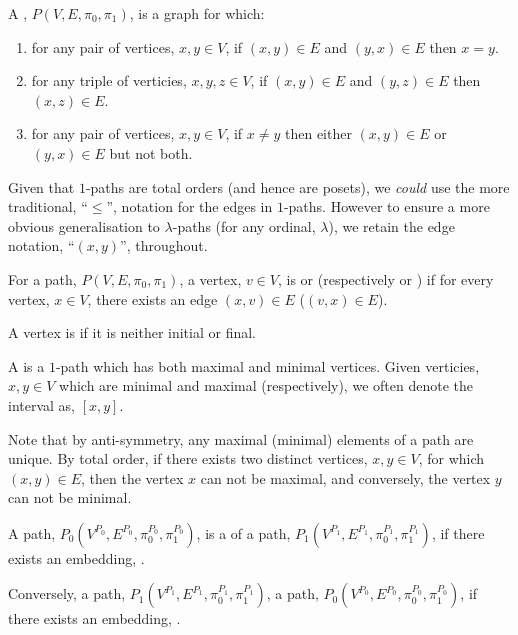 \documentclass[a4paper]{amsart}
\begin{document}
\begin{definition}
A , $P(V, E, \pi_0, \pi_1)$, is a graph for which:

\begin{enumerate}
\item {} for any pair of vertices, $x, y \in V$, if $(x,y) \in E$ and
$(y,x) \in E$ then $x = y$.

\item {} for any triple of verticies, $x, y, z \in V$, 
if $(x,y) \in E$ and $(y,z) \in E$ then $(x,z) \in E$.

\item {} for any pair of vertices, $x, y \in V$, if $x \neq y$ then
either $(x,y) \in E$ or $(y,x) \in E$ but not both.
\end{enumerate}
\end{definition}

Given that $1$-paths are total orders (and hence are posets), we \emph{could} use the more
traditional, ``$\leq$'', notation for the edges in $1$-paths. However to ensure a more
obvious generalisation to $\lambda$-paths (for any ordinal, $\lambda$), we retain the edge
notation, ``$(x,y)$'', throughout.

\begin{definition}
For a path, $P(V, E, \pi_0, \pi_1)$, a vertex, $v \in V$, is  or
 (respectively  or ) if for every
vertex, $x \in V$, there exists an edge $(x,v) \in E$ ($(v, x) \in E$).

A vertex is  if it is neither initial or final.

A  is a $1$-path which has both maximal and minimal vertices. Given 
verticies, $x, y \in V$ which are minimal and maximal (respectively), we often denote the 
interval as, $[x,y]$.
\end{definition}

Note that by anti-symmetry, any maximal (minimal) elements of a path are unique. By total
order, if there exists two distinct vertices, $x,y \in V$, for which $(x,y) \in E$, then
the vertex $x$ can not be maximal, and conversely, the vertex $y$ can not be minimal.

\begin{definition}
A path, $P_0(V^{P_0}, E^{P_0}, \pi^{P_0}_0, \pi^{P_0}_1)$, is a  of a
path, $P_1(V^{P_1}, E^{P_1}, \pi^{P_1}_0, \pi^{P_1}_1)$, if there exists an embedding,
.

Conversely, a path, $P_1(V^{P_1}, E^{P_1}, \pi^{P_1}_0, \pi^{P_1}_1)$, 
a path, $P_0(V^{P_0}, E^{P_0}, \pi^{P_0}_0, \pi^{P_0}_1)$, if there exists an embedding,
.
\end{definition}
\end{document}
